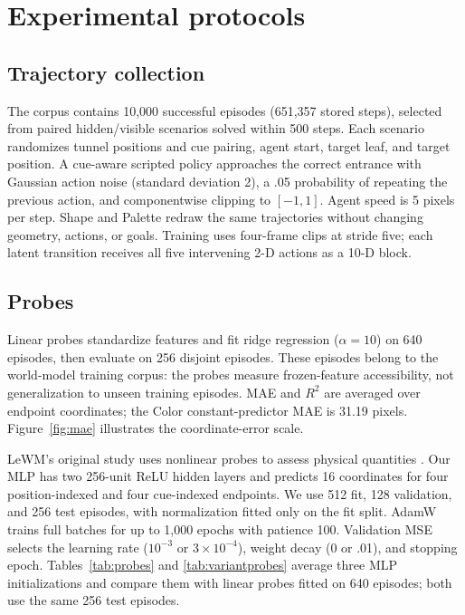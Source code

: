 \section{Experimental protocols}
\label{app:protocols}

\subsection{Trajectory collection}
\label{app:collection}

The corpus contains 10,000 successful episodes (651,357 stored steps),
selected from paired hidden/visible scenarios solved within 500 steps.
Each scenario randomizes tunnel positions and cue pairing, agent start,
target leaf, and target position. A cue-aware scripted policy approaches
the correct entrance with Gaussian action noise (standard deviation 2),
a .05 probability of repeating the previous action, and componentwise
clipping to $[-1,1]$. Agent speed is 5 pixels per step. Shape and Palette
redraw the same trajectories without changing geometry, actions, or goals.
Training uses four-frame clips at stride five; each latent transition
receives all five intervening 2-D actions as a 10-D block.

\subsection{Probes}
\label{app:probes}

Linear probes standardize features and fit ridge regression ($\alpha=10$)
on 640 episodes, then evaluate on 256 disjoint episodes. These episodes
belong to the world-model training corpus: the probes measure frozen-feature
accessibility, not generalization to unseen training episodes. MAE and $R^2$
are averaged over endpoint coordinates; the Color constant-predictor MAE is
31.19 pixels. Figure~\ref{fig:mae} illustrates the coordinate-error scale.

LeWM's original study uses nonlinear probes to assess physical quantities
\citep{maes2026leworldmodel}. Our MLP has two 256-unit ReLU hidden layers
and predicts 16 coordinates for four position-indexed and four cue-indexed
endpoints. We use 512 fit, 128 validation, and 256 test episodes, with
normalization fitted only on the fit split. AdamW trains full batches for
up to 1,000 epochs with patience 100. Validation MSE selects the learning
rate ($10^{-3}$ or $3\times10^{-4}$), weight decay (0 or .01), and stopping
epoch. Tables~\ref{tab:probes} and \ref{tab:variantprobes} average three MLP
initializations and compare them with linear probes fitted on 640 episodes;
both use the same 256 test episodes.

